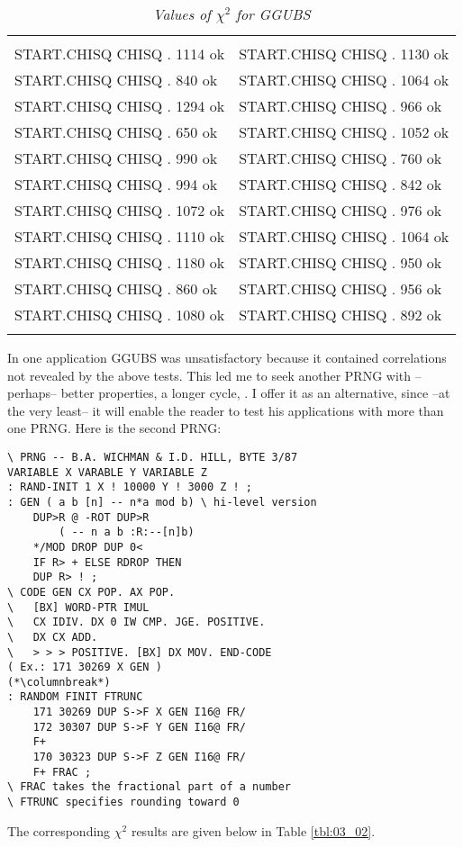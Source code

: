 \begin{table}
    \caption{\textit{Values of $\chi^2$ for GGUBS}}
    \label{tbl:03_01}
        \setlength{\tabcolsep}{20pt}
        \begin{tabular}{|ll|}
            \hline & \\
            START.CHISQ CHISQ . 1114 ok &  START.CHISQ CHISQ . 1130 ok \\ 
            START.CHISQ CHISQ . 840 ok  &  START.CHISQ CHISQ . 1064 ok \\
            START.CHISQ CHISQ . 1294 ok &  START.CHISQ CHISQ . 966 ok  \\
            START.CHISQ CHISQ . 650 ok  &  START.CHISQ CHISQ . 1052 ok \\
            START.CHISQ CHISQ . 990 ok  &  START.CHISQ CHISQ . 760 ok  \\
            START.CHISQ CHISQ . 994 ok  &  START.CHISQ CHISQ . 842 ok  \\
            START.CHISQ CHISQ . 1072 ok &  START.CHISQ CHISQ . 976 ok  \\
            START.CHISQ CHISQ . 1110 ok &  START.CHISQ CHISQ . 1064 ok \\
            START.CHISQ CHISQ . 1180 ok &  START.CHISQ CHISQ . 950 ok  \\
            START.CHISQ CHISQ . 860 ok  &  START.CHISQ CHISQ . 956 ok  \\
            START.CHISQ CHISQ . 1080 ok &  START.CHISQ CHISQ . 892 ok  \\
            & \\
            \hline
        \end{tabular} 
\end{table}

In one application GGUBS was unsatisfactory because it contained correlations not revealed by the above tests. This led me to seek another PRNG with --perhaps-- better properties, a longer cycle, \etc. I offer it as an alternative, since --at the very least-- it will enable the reader to test his applications with more than one PRNG. Here is the second PRNG:

\begin{multicols}{2}
\setlength{\columnsep}{1.5cm}
\setlength{\columnseprule}{0.2pt}
\tiny
\begin{lstlisting}
\ PRNG -- B.A. WICHMAN & I.D. HILL, BYTE 3/87
VARIABLE X VARABLE Y VARIABLE Z
: RAND-INIT 1 X ! 10000 Y ! 3000 Z ! ;
: GEN ( a b [n] -- n*a mod b) \ hi-level version
    DUP>R @ -ROT DUP>R
        ( -- n a b :R:--[n]b)
    */MOD DROP DUP 0<
    IF R> + ELSE RDROP THEN
    DUP R> ! ;
\ CODE GEN CX POP. AX POP.
\   [BX] WORD-PTR IMUL
\   CX IDIV. DX 0 IW CMP. JGE. POSITIVE.
\   DX CX ADD.
\   > > > POSITIVE. [BX] DX MOV. END-CODE
( Ex.: 171 30269 X GEN )
(*\columnbreak*)
: RANDOM FINIT FTRUNC
    171 30269 DUP S->F X GEN I16@ FR/
    172 30307 DUP S->F Y GEN I16@ FR/
    F+
    170 30323 DUP S->F Z GEN I16@ FR/
    F+ FRAC ;
\ FRAC takes the fractional part of a number 
\ FTRUNC specifies rounding toward 0
\end{lstlisting}
\end{multicols}
The corresponding $\chi^2$ results are given below in Table \ref{tbl:03_02}.

